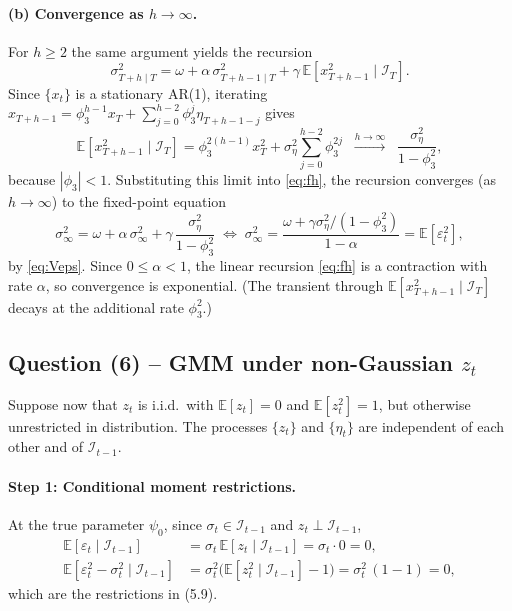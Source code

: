 \documentclass[12pt]{article}
\newcommand{\E}{\mathbb{E}}
\newcommand{\Info}{\mathcal{I}}
\begin{document}
\paragraph{(b) Convergence as $h\to\infty$.} For $h\geq 2$ the same argument yields the recursion
\begin{equation}
\sigma_{T+h\mid T}^2 = \omega + \alpha\,\sigma_{T+h-1\mid T}^2 + \gamma\,\E[x_{T+h-1}^2\mid\Info_T].\label{eq:fh}
\end{equation}
Since $\{x_t\}$ is a stationary AR(1), iterating $x_{T+h-1}=\phi_3^{h-1}x_T+\sum_{j=0}^{h-2}\phi_3^{j}\eta_{T+h-1-j}$ gives
\begin{equation*}
\E[x_{T+h-1}^2\mid\Info_T] = \phi_3^{2(h-1)} x_T^2 + \sigma_\eta^2\sum_{j=0}^{h-2}\phi_3^{2j}
\;\;\xrightarrow{h\to\infty}\;\;\frac{\sigma_\eta^2}{1-\phi_3^2},
\end{equation*}
because $|\phi_3|<1$. Substituting this limit into \eqref{eq:fh}, the recursion converges (as $h\to\infty$) to the fixed-point equation
\begin{equation*}
\sigma_{\infty}^2 = \omega + \alpha\,\sigma_{\infty}^2 + \gamma\,\frac{\sigma_\eta^2}{1-\phi_3^2}
\;\Longleftrightarrow\;
\sigma_{\infty}^2 = \frac{\omega+\gamma\sigma_\eta^2/(1-\phi_3^2)}{1-\alpha} = \E[\varepsilon_t^2],
\end{equation*}
by \eqref{eq:Veps}. Since $0\leq\alpha<1$, the linear recursion \eqref{eq:fh} is a contraction with rate $\alpha$, so convergence is exponential. (The transient through $\E[x_{T+h-1}^2\mid\Info_T]$ decays at the additional rate $\phi_3^2$.)

\subsection*{Question (6) -- GMM under non-Gaussian $z_t$}\label{sec:p3-q6}

Suppose now that $z_t$ is i.i.d.\ with $\E[z_t]=0$ and $\E[z_t^2]=1$, but otherwise unrestricted in distribution. The processes $\{z_t\}$ and $\{\eta_t\}$ are independent of each other and of $\Info_{t-1}$.

\paragraph{Step 1: Conditional moment restrictions.} At the true parameter $\psi_0$, since $\sigma_t\in\Info_{t-1}$ and $z_t\perp\Info_{t-1}$,
\begin{align}
\E[\varepsilon_t\mid\Info_{t-1}]
&= \sigma_t\,\E[z_t\mid\Info_{t-1}] = \sigma_t\cdot 0 = 0,\label{eq:mom1}\\
\E[\varepsilon_t^2-\sigma_t^2\mid\Info_{t-1}]
&= \sigma_t^2\big(\E[z_t^2\mid\Info_{t-1}]-1\big) = \sigma_t^2\,(1-1) = 0,\label{eq:mom2}
\end{align}
which are the restrictions in (5.9).
\end{document}

